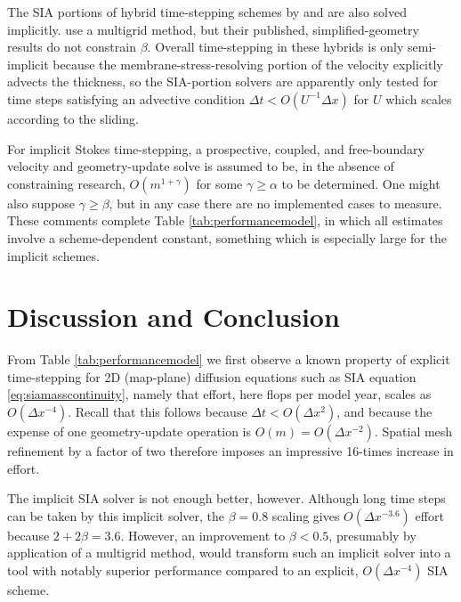 \documentclass[twocolumn,letterpaper]{igs}
\begin{document}
The SIA portions of hybrid time-stepping schemes by \cite{JouvetGraeser2013} and \cite{BrinkerhoffJohnson2015} are also solved implicitly.  \cite{JouvetGraeser2013} use a multigrid method, but their published, simplified-geometry results do not constrain $\beta$.  Overall time-stepping in these hybrids is only semi-implicit because the membrane-stress-resolving portion of the velocity explicitly advects the thickness, so the SIA-portion solvers are apparently only tested for time steps satisfying an advective condition $\Delta t < O(U^{-1}\Delta x)$ for $U$ which scales according to the sliding.

For implicit Stokes time-stepping, a prospective, coupled, and free-boundary velocity and geometry-update solve is assumed to be, in the absence of constraining research, $O(m^{1+\gamma})$ for some $\gamma \ge \alpha$ to be determined.  One might also suppose $\gamma\ge \beta$, but in any case there are no implemented cases to measure.  These comments complete Table \ref{tab:performancemodel}, in which all estimates involve a scheme-dependent constant, something which is especially large for the implicit schemes.



\section{Discussion and Conclusion}

From Table \ref{tab:performancemodel} we first observe a known property of explicit time-stepping for 2D (map-plane) diffusion equations such as SIA equation \eqref{eq:siamasscontinuity}, namely that effort, here flops per model year, scales as $O(\Delta x^{-4})$.  Recall that this follows because $\Delta t < O(\Delta x^2)$, and because the expense of one geometry-update operation is $O(m) = O(\Delta x^{-2})$.  Spatial mesh refinement by a factor of two therefore imposes an impressive 16-times increase in effort.

The \cite{Bueler2016} implicit SIA solver is not enough better, however.  Although long time steps can be taken by this implicit solver, the $\beta=0.8$ scaling gives $O(\Delta x^{-3.6})$ effort because $2+2\beta=3.6$.  However, an improvement to $\beta < 0.5$, presumably by application of a multigrid method, would transform such an implicit solver into a tool with notably superior performance compared to an explicit, $O(\Delta x^{-4})$ SIA scheme.
\end{document}
